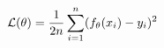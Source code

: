 \documentclass[preview]{standalone}
\begin{document}
\begin{align*}
\special{dvisvgm:raw <g id='unique000'>}\mathcal{L}(\theta)=\frac{1}{2n}\sum_{i=1}^{n}(f_\theta(x_i)-y_i)^2\special{dvisvgm:raw </g>}
\end{align*}
\end{document}
